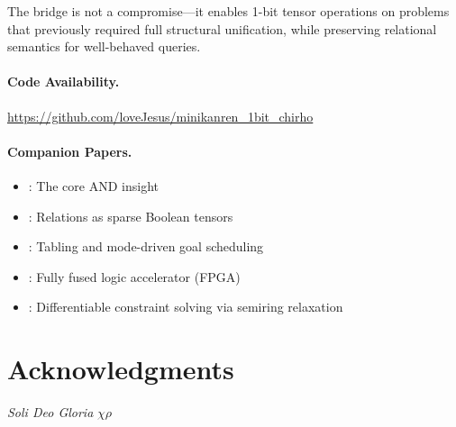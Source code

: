 \documentclass[11pt,a4paper]{article}
\begin{document}
The bridge is not a compromise---it enables 1-bit tensor operations on problems
that previously required full structural unification, while preserving relational
semantics for well-behaved queries.

\paragraph{Code Availability.}
\url{https://github.com/loveJesus/minikanren_1bit_chirho}

\paragraph{Companion Papers.}
\begin{itemize}
  \item \paperA: The core AND insight
  \item \paperB: Relations as sparse Boolean tensors
  \item \paperD: Tabling and mode-driven goal scheduling
  \item \paperE: Fully fused logic accelerator (FPGA)
  \item \paperF: Differentiable constraint solving via semiring relaxation
\end{itemize}

\section*{Acknowledgments}

\standardacknowledgments


% 

\vspace{1em}
\begin{center}
\textit{Soli Deo Gloria} $\chi\rho$
\end{center}
\end{document}
